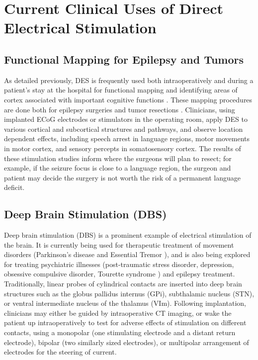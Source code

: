 \section{Current Clinical Uses of Direct Electrical Stimulation}

\subsection{Functional Mapping for Epilepsy and Tumors}

As detailed previously, DES is frequently used both intraoperatively and during a patient’s stay at the hospital for functional mapping and identifying areas of cortex associated with important cognitive functions \cite{Ojemann1989,Berger1989,Berger1992}. These mapping procedures are done both for epilepsy surgeries and tumor resections \cite{Ojemann1989,Berger1989,Berger1992}. Clinicians, using implanted ECoG electrodes or stimulators in the operating room, apply DES to various cortical and subcortical structures and pathways, and observe location dependent effects, including speech arrest in language regions, motor movements in motor cortex, and sensory percepts in somatosensory cortex. The results of these stimulation studies inform where the surgeons will plan to resect; for example, if the seizure focus is close to a language region, the surgeon and patient may decide the surgery is not worth the risk of a permanent language deficit. 

\subsection{Deep Brain Stimulation (DBS)}
	
Deep brain stimulation (DBS) is a prominent example of electrical stimulation of the brain. It is currently being used for therapeutic treatment of movement disorders (Parkinson’s disease \cite{Bronstein2011} and Essential Tremor \cite{DellaFlora2010}), and is also being explored for treating psychiatric illnesses (post-traumatic stress disorder, depression, obsessive compulsive disorder, Tourette syndrome \cite{Schrock2015}) and epilepsy treatment. Traditionally, linear probes of cylindrical contacts are inserted into deep brain structures such as the globus pallidus internus (GPi), subthalamic nucleus (STN), or ventral intermediate nucleus of the thalamus (VIm). Following implantation, clinicians may either be guided by intraoperative CT imaging, or wake the patient up intraoperatively to test for adverse effects of stimulation on different contacts, using a monopolar (one stimulating electrode and a distant return electrode), bipolar (two similarly sized electrodes), or multipolar arrangement of electrodes for the steering of current. 

